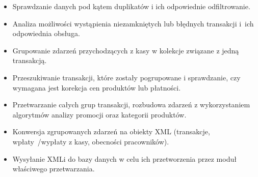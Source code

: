 \documentclass[a4paper]{book}
\begin{document}
\begin{itemize}
	\item Sprawdzanie danych pod kątem duplikatów i ich odpowiednie odfiltrowanie.
	\item Analiza możliwości wystąpienia niezamkniętych lub błędnych transakcji i~ich odpowiednia obsługa.
	\item Grupowanie zdarzeń przychodzących z kasy w kolekcje związane z jedną transakcją.
	\item Przeszukiwanie transakcji, które zostały pogrupowane i sprawdzanie, czy wymagana jest korekcja cen produktów lub płatności.
	\item Przetwarzanie całych grup transakcji, rozbudowa zdarzeń z wykorzystaniem algorytmów analizy promocji oraz kategorii produktów.
	\item Konwersja zgrupowanych zdarzeń na obiekty XML (transakcje, wpłaty~/wypłaty z kasy, obecności pracowników).
	\item Wysyłanie XMLi do bazy danych w celu ich przetworzenia przez moduł właściwego przetwarzania.
\end{itemize}
\end{document}
